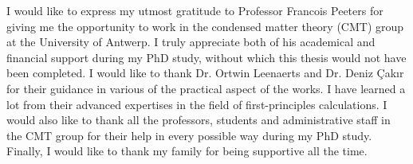 
\begin{acknowledgements}      


I would like to express my utmost gratitude to Professor Francois Peeters for giving me the opportunity to work in the condensed matter theory (CMT) group at the University of Antwerp. I truly appreciate both of his academical and financial support during my PhD study, without which this thesis would not have been completed. I would like to thank Dr. Ortwin Leenaerts and Dr. Deniz Çakır for their guidance in various of the practical aspect of the works. I have learned a lot from their advanced expertises in the field of first-principles calculations. I would also like to thank all the professors, students and administrative staff in the CMT group for their help in every possible way during my PhD study. Finally, I would like to thank my family for being supportive all the time.

\end{acknowledgements}
